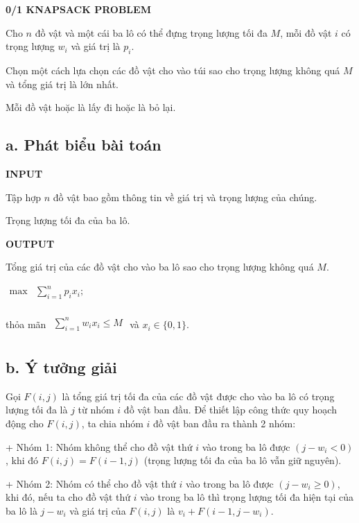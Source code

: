\documentclass[12pt, a4paper, fleqn]{article}
\begin{document}
	
	\textbf{0/1 KNAPSACK PROBLEM}
	
	Cho $n$ đồ vật và một cái ba lô có thể đựng trọng lượng	tối đa $M$, mỗi đồ vật $i$ có trọng lượng $w_i$ và giá trị là $p_i$.
	
	Chọn một cách lựa chọn các đồ vật cho vào túi sao cho trọng lượng không quá $M$ và tổng giá trị là lớn nhất.
	
	Mỗi đồ vật hoặc là lấy đi hoặc là bỏ lại.
	
	\subsection*{a. Phát biểu bài toán}
	
	\textbf{INPUT}
	
	Tập hợp $n$ đồ vật bao gồm thông tin về giá trị và trọng lượng của chúng.
	
	Trọng lượng tối đa của ba lô.
	
	\textbf{OUTPUT}
	
	Tổng giá trị của các đồ vật cho vào ba lô sao cho trọng lượng không quá $M$.
	
	${\displaystyle
		{\begin{aligned}
			\max &\sum _{ i = 1}^{n}p_i x_i;\\
			\end{aligned}}}$
	
	thỏa mãn ${\displaystyle
		{\begin{aligned}
			\sum _{ i = 1}^{n}w_i x_i \leq M\\
			\end{aligned}}}$ và $x_{i}\in \{0,1\}$.
		
	\subsection*{b. Ý tưởng giải}
	
	Gọi $F(i, j)$ là tổng giá trị tối đa của các đồ vật được cho vào ba lô có trọng lượng tối đa là $j$ từ nhóm $i$ đồ vật ban đầu. Để thiết lập công thức quy hoạch động cho $F(i, j)$, ta chia nhóm $i$ đồ vật ban đầu ra thành 2 nhóm:
	
	+ Nhóm 1: Nhóm không thể cho đồ vật thứ $i$ vào trong ba lô được $(j - w_i < 0)$, khi đó $F(i, j) = F(i - 1, j)$ (trọng lượng tối đa của ba lô vẫn giữ nguyên).
	
	+ Nhóm 2: Nhóm có thể cho đồ vật thứ $i$ vào trong ba lô được $(j - w_i \geq 0)$, khi đó, nếu ta cho đồ vật thứ $i$ vào trong ba lô thì trọng lượng tối đa hiện tại của ba lô là $j - w_i$ và giá trị của $F(i, j)$ là $v_i + F(i - 1, j - w_i)$.
	
\end{document}
